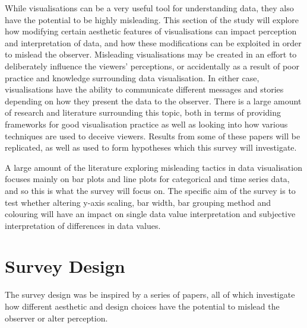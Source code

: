 \documentclass[
  12pt,
  twocolumn]{book}
\begin{document}
While visualisations can be a very useful tool for understanding data,
they also have the potential to be highly misleading. This section of
the study will explore how modifying certain aesthetic features of
visualisations can impact perception and interpretation of data, and how
these modifications can be exploited in order to mislead the observer.
Misleading visualisations may be created in an effort to deliberately
influence the viewers' perceptions, or accidentally as a result of poor
practice and knowledge surrounding data visualisation. In either case,
visualisations have the ability to communicate different messages and
stories depending on how they present the data to the observer. There is
a large amount of research and literature surrounding this topic, both
in terms of providing frameworks for good visualisation practice as well
as looking into how various techniques are used to deceive viewers.
Results from some of these papers will be replicated, as well as used to
form hypotheses which this survey will investigate.

A large amount of the literature exploring misleading tactics in data
visualisation focuses mainly on bar plots and line plots for categorical
and time series data, and so this is what the survey will focus on. The
specific aim of the survey is to test whether altering y-axis scaling,
bar width, bar grouping method and colouring will have an impact on
single data value interpretation and subjective interpretation of
differences in data values.

\section{Survey Design}

The survey design was be inspired by a series of papers, all of which
investigate how different aesthetic and design choices have the
potential to mislead the observer or alter perception.
\end{document}
